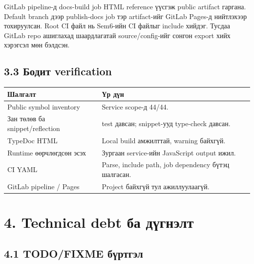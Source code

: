 \documentclass[
  mongolian,
]{article}
\begin{document}
GitLab pipeline-д docs-build job HTML reference үүсгэж public artifact
гаргана. Default branch дээр publish-docs job тэр artifact-ийг GitLab
Pages-д нийтлэхээр тохируулсан. Root CI файл нь Sem6-ийн CI файлыг
include хийдэг. Тусдаа GitLab repo ашиглахад шаардлагатай
source/config-ийг сонгон export хийх хэрэгсэл мөн бэлдсэн.

\subsection{3.3 Бодит
verification}\label{ux431ux43eux434ux438ux442-verification}

\begin{longtable}[]{@{}
  >{\raggedright\arraybackslash}p{}
  >{\raggedright\arraybackslash}p{}@{}}
\toprule\noalign{}
\begin{minipage}[b]{\linewidth}\raggedright
Шалгалт
\end{minipage} & \begin{minipage}[b]{\linewidth}\raggedright
Үр дүн
\end{minipage} \\
\midrule\noalign{}
\endhead
\bottomrule\noalign{}
\endlastfoot
Public symbol inventory & Service scope-д 44/44. \\
Зан төлөв ба snippet/reflection & 9 test давсан; snippet-ууд type-check
давсан. \\
TypeDoc HTML & Local build амжилттай, warning байхгүй. \\
Runtime өөрчлөгдсөн эсэх & Зургаан service-ийн JavaScript output
ижил. \\
CI YAML & Parse, include path, job dependency бүтэц шалгасан. \\
GitLab pipeline / Pages & Project байхгүй тул ажиллуулаагүй. \\
\end{longtable}

\clearpage

\section{4. Technical debt ба
дүгнэлт}\label{technical-debt-ux431ux430-ux434ux4afux433ux43dux44dux43bux442}

\subsection{4.1 TODO/FIXME
бүртгэл}\label{todofixme-ux431ux4afux440ux442ux433ux44dux43b}
\end{document}
